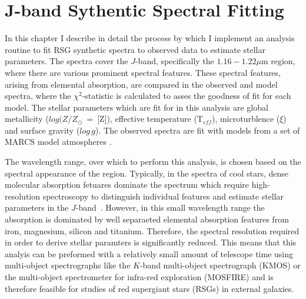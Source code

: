 


% 
\chapter{J-band Sythentic Spectral Fitting}

In this chapter I describe in detail the process by which I implement an analysis
routine to fit RSG synthetic spectra to observed data to estimate stellar parameters.
The spectra cover the $J$-band, specifically the $1.16-1.22\mu$m region, where there are various prominent spectral features.
These spectral features, arising from elemental absorption, are compared in the observed and model spectra,
where the $\chi^{2}$-statistic is calculated to asses the goodness of fit for each model.
The stellar parameters which are fit for in this analysis are global metallicity ($log (Z/Z_{\odot}$~=~[Z]), effective temperature (T$_{eff}$), microturblence ($\xi$) and surface gravity ($log\,g$).
The observed spectra are fit with models from a set of MARCS model atmospheres
\citep{2008A&A...486..951G}.

The wavelength range, over which to perform this analysis,
is chosen based on the spectral appearance of the region.
Typically, in the spectra of cool stars, dense molecular absorption fetuares dominate the spectrum which require high-resolution spectroscopy to distinguish individual features and estimate stellar parameters in the $J$-band~\citep{Cunha07, Davies09a, Davies09b}.
However, in this small wavelength range the absorption is dominated by well separaeted elemental absorption features from iron, magnesium, silicon and titanium.
Therefore, the spectral resolution required in order to derive stellar paramters is significantly reduced.
This means that this analyis can be preformed with a relatively small amount of telescope time using multi-object spectrographs like the $K$-band multi-object spectrograph (KMOS)
or the multi-object spectrometer for infra-red exploration (MOSFIRE) and is therefore feasible for studies of red supergiant stars (RSGs) in external galaxies.

